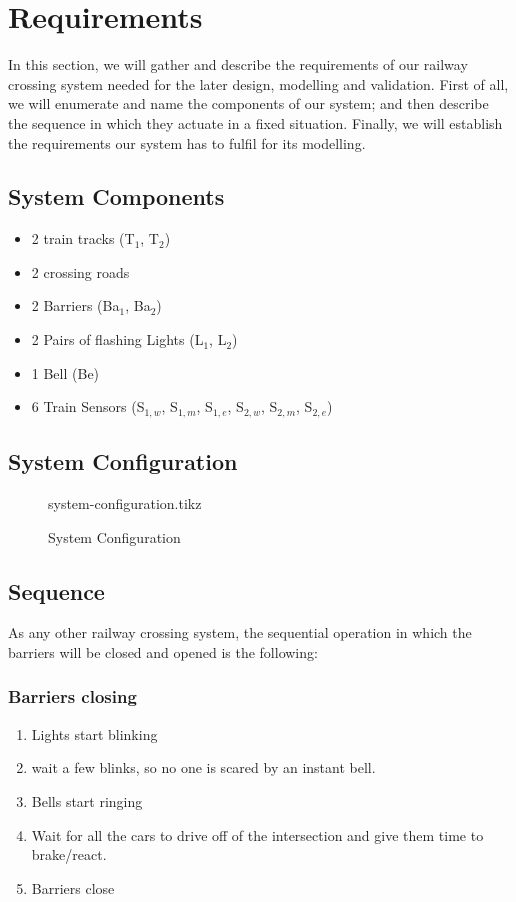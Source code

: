 \documentclass[final]{report}
\begin{document}
\chapter{Requirements}
In this section, we will gather and describe the requirements of our railway crossing system needed for the later design, modelling and validation.
First of all, we will enumerate and name the components of our system; and then describe the sequence in which they actuate in a fixed situation.
Finally, we will establish the requirements our system has to fulfil for its modelling.


\section{System Components} 
\begin{itemize}
\item 2 train tracks (T$_{1}$, T$_{2}$)
\item 2 crossing roads 
\item 2 Barriers (Ba$_{1}$, Ba$_{2}$)
\item 2 Pairs of flashing Lights (L$_{1}$, L$_{2}$) 
\item 1 Bell (Be)
\item 6 Train Sensors (S$_{1,w}$, S$_{1,m}$, S$_{1,e}$, S$_{2,w}$, S$_{2,m}$, S$_{2,e}$)
\end{itemize}

\section{System Configuration}
\begin{figure}[H]
	\centering
	{system-configuration.tikz}
	\caption{System Configuration}
	\label{fig:system-configuration}
\end{figure}

\section{Sequence}
As any other railway crossing system, the sequential operation in which the barriers will be closed and opened is the following:

\subsection{Barriers closing}
\begin{enumerate}
\item Lights start blinking
\item wait a few blinks, so no one is scared by an instant bell.
\item Bells start ringing
\item Wait for all the cars to drive off of the intersection and give them time to brake/react.
\item Barriers close
\end{enumerate}
\end{document}
